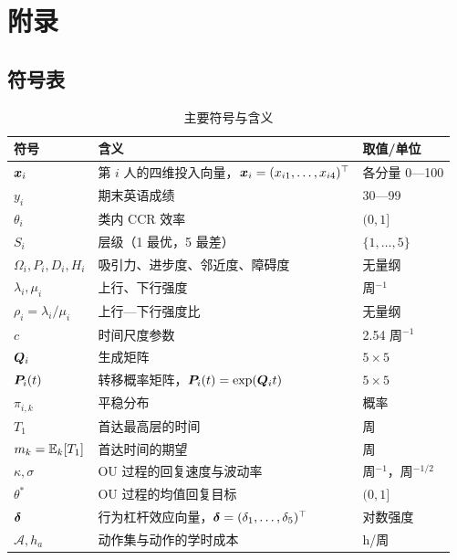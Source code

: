 \newpage
\section*{附\quad 录}
\setcounter{subsection}{0}

\subsection{符号表}

\begin{table}[H]
\centering
\tabfont
\caption{主要符号与含义}
\label{tab:symbol}
\begin{tabularx}{\textwidth}{@{}p{2.6cm}Xp{4.0cm}@{}}
\toprule
符号 & 含义 & 取值/单位 \\
\midrule
$\bm{x}_i$ & 第 $i$ 人的四维投入向量，$\bm{x}_i=(x_{i1},\dots,x_{i4})^{\top}$ & 各分量 0—100 \\
$y_i$ & 期末英语成绩 & 30—99 \\
$\theta_i$ & 类内 CCR 效率 & $(0,1]$ \\
$S_i$ & 层级（1 最优，5 最差） & $\{1,\dots,5\}$ \\
$\Omega_i,P_i,D_i,H_i$ & 吸引力、进步度、邻近度、障碍度 & 无量纲 \\
$\lambda_i,\mu_i$ & 上行、下行强度 & 周$^{-1}$ \\
$\rho_i=\lambda_i/\mu_i$ & 上行—下行强度比 & 无量纲 \\
$c$ & 时间尺度参数 & 2.54 周$^{-1}$ \\
$\bm{Q}_i$ & 生成矩阵 & $5\times5$ \\
$\bm{P}_i(t)$ & 转移概率矩阵，$\bm{P}_i(t)=\exp(\bm{Q}_i t)$ & $5\times5$ \\
$\pi_{i,k}$ & 平稳分布 & 概率 \\
$T_1$ & 首达最高层的时间 & 周 \\
$m_k=\mathbb{E}_k[T_1]$ & 首达时间的期望 & 周 \\
$\kappa,\sigma$ & OU 过程的回复速度与波动率 & 周$^{-1}$，周$^{-1/2}$ \\
$\theta^{*}$ & OU 过程的均值回复目标 & $(0,1]$ \\
$\bm{\delta}$ & 行为杠杆效应向量，$\bm{\delta}=(\delta_1,\dots,\delta_5)^{\top}$ & 对数强度 \\
$\mathcal{A},h_a$ & 动作集与动作的学时成本 & h/周 \\
\bottomrule
\end{tabularx}
\end{table}

